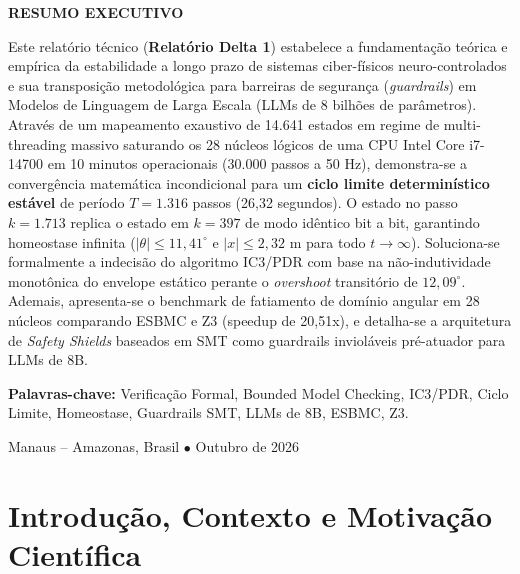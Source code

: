 \documentclass[11pt,a4paper]{article}
\theoremstyle{definition}
\begin{document}
\begin{titlepage}
    \vspace{0.4cm}
    \begin{minipage}{0.95\textwidth}
        \small
        \begin{center}\textbf{RESUMO EXECUTIVO}\end{center}
        \noindent Este relatório técnico (\textbf{Relatório Delta 1}) estabelece a fundamentação teórica e empírica da estabilidade a longo prazo de sistemas ciber-físicos neuro-controlados e sua transposição metodológica para barreiras de segurança (\textit{guardrails}) em Modelos de Linguagem de Larga Escala (LLMs de 8 bilhões de parâmetros). Através de um mapeamento exaustivo de 14.641 estados em regime de multi-threading massivo saturando os 28 núcleos lógicos de uma CPU Intel Core i7-14700 em 10 minutos operacionais (30.000 passos a 50 Hz), demonstra-se a convergência matemática incondicional para um \textbf{ciclo limite determinístico estável} de período $T = 1.316$ passos (26,32 segundos). O estado no passo $k=1.713$ replica o estado em $k=397$ de modo idêntico bit a bit, garantindo homeostase infinita ($|\theta| \le 11,41^\circ$ e $|x| \le 2,32$ m para todo $t \to \infty$). Soluciona-se formalmente a indecisão do algoritmo IC3/PDR com base na não-indutividade monotônica do envelope estático perante o \textit{overshoot} transitório de $12,09^\circ$. Ademais, apresenta-se o benchmark de fatiamento de domínio angular em 28 núcleos comparando ESBMC e Z3 (speedup de 20,51x), e detalha-se a arquitetura de \textit{Safety Shields} baseados em SMT como guardrails invioláveis pré-atuador para LLMs de 8B.
        \vspace{0.2cm}
        
        \noindent\textbf{Palavras-chave:} Verificação Formal, Bounded Model Checking, IC3/PDR, Ciclo Limite, Homeostase, Guardrails SMT, LLMs de 8B, ESBMC, Z3.
    \end{minipage}
    
    \vfill
    {\small Manaus -- Amazonas, Brasil $\bullet$ Outubro de 2026}
\end{titlepage}

\newpage
\setcounter{page}{2}

\section{Introdução, Contexto e Motivação Científica}
\end{document}
